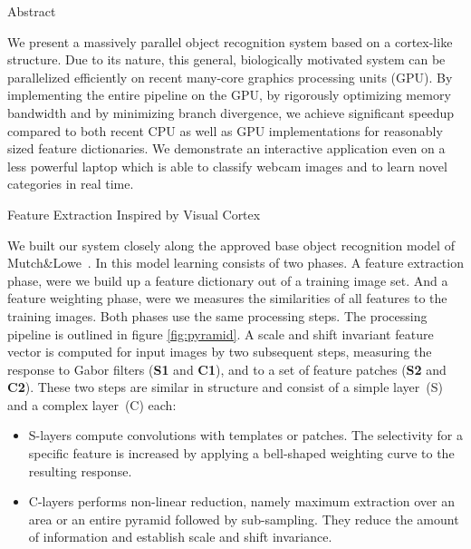 \documentclass[final]{beamer}
\title[]{}
\author[]{Helmut Sedding and Ferdinand Deger}
\institute[]{Institute of Media Informatics, University Ulm}
\date{Jul. 31th, 2007}
\begin{document}
  \begin{frame}{} 
  
    \begin{columns}[t]
        \begin{column}{.48\linewidth}
            \begin{block}{Abstract}

We present a massively parallel object recognition system based on a cortex-like structure. Due to its nature, this general, biologically motivated system can be parallelized efficiently on recent many-core graphics processing units (GPU). By implementing the entire pipeline on the GPU, by rigorously optimizing memory bandwidth and by minimizing branch divergence, we achieve significant speedup compared to both recent CPU as well as GPU implementations for reasonably sized feature dictionaries. We demonstrate an interactive application even on a less powerful laptop which is able to classify webcam images and to learn novel categories in real time.\newline
        \end{block}
        
        \begin{block} {Feature Extraction Inspired by Visual Cortex}
        
We built our system closely along the approved base object recognition model of
Mutch\&Lowe~\cite{mutch06}. \newline
In this model learning consists of two phases. A feature extraction
phase, were we build up a feature dictionary out of a training image set. And a
feature weighting phase, were we measures the similarities of all features
to the training images.  Both phases use the same processing steps. \newline
The processing pipeline is outlined in figure \ref{fig:pyramid}. A scale and shift invariant
feature vector is computed for input images by two subsequent steps,
measuring the response to Gabor filters (\textbf{S1} and \textbf{C1}), and to a set of feature
patches (\textbf{S2} and \textbf{C2}).
These two steps are similar in structure and consist of a simple layer~(S)
and a complex layer~(C) each:\newline
\begin{itemize}
\item
S-layers compute convolutions with templates or patches. The
selectivity for a specific feature is increased by applying a
bell-shaped weighting curve to the resulting
response.
\item C-layers performs non-linear reduction, namely maximum
  extraction over an area or an entire pyramid followed by
  sub-sampling. They reduce the amount of information and establish
  scale and shift invariance.\newline
\end{itemize}


\end{block}
\end{column}
\end{columns}
\end{frame}
\end{document}
